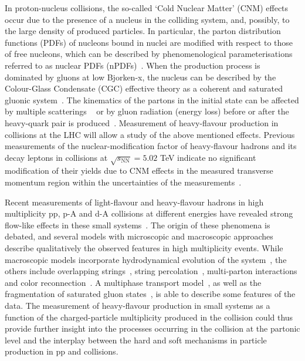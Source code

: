 In proton-nucleus collisions, the so-called ‘Cold Nuclear Matter’ (CNM) effects occur due to the presence of a nucleus in the colliding system, and, possibly, to the large density of produced particles. In particular, the parton distribution functions (PDFs) of nucleons bound in nuclei are modified with respect to those of free nucleons, which can be described by phenomenological parameterisations referred to as nuclear PDFs (nPDFs)~\cite{Eskola:2009uj,deFlorian:2003qf,Hirai:2007sx}. When the production process is dominated by gluons at low Bjorken-x, the nucleus can be described by the Colour-Glass Condensate (CGC) effective theory as a coherent and saturated gluonic system~\cite{Fujii:2013yja,Tribedy:2011aa,Albacete:2012xq,Rezaeian:2012ye}. The kinematics of the partons in the initial state can be affected by multiple scatterings 
~\cite{Lev:1983hh,Kopeliovich:2002yh} or by gluon radiation (energy loss) before or after the heavy-quark pair is produced~\cite{Vitev:2007ve}. Measurement of heavy-flavour production in \pPb collisions at the LHC will allow a study of the above mentioned effects. Previous measurements of the nuclear-modification factor of heavy-flavour hadrons and its decay leptons in \pPb collisions at $\sqrt{s_{\textrm{NN}}}=5.02$ TeV indicate no significant modification of their yields due to CNM effects in the measured  transverse momentum region within the uncertainties of the measurements~\cite{Adam:2015qda,Adam:2016wyz,Abelev:2014hha}. 


Recent measurements of light-flavour and heavy-flavour hadrons in high multiplicity pp, p-A and d-A collisions at different energies have revealed strong flow-like effects in these small systems~\cite{Acharya:2018dxy,Abelev:2012ola,Aaboud:2016yar,Chatrchyan:2013nka,ABELEV:2013wsa,Khachatryan:2014jra,Adare:2013piz,Adamczyk:2015xjc,Adare:2015ctn,Khachatryan:2010gv}. The origin of these phenomena is debated, and several models with microscopic and macroscopic approaches describe qualitatively the observed features in high multiplicity events.  While macroscopic models incorporate hydrodynamical evolution of the system~\cite{Werner:2010ss,Deng:2011at,Werner:2013ipa}, the others include overlapping strings~\cite{Bierlich:2014xba}, string percolation~\cite{Bautista:2015kwa}, multi-parton interactions and color reconnection~\cite{Sjostrand:2014zea,Ortiz:2013yxa}. A multiphase transport model~\cite{Koop:2015wea}, as well as the fragmentation of saturated gluon states~\cite{Schlichting:2016sqo,Schenke:2016lrs}, is able to describe some features of the data. The measurement of heavy-flavour production in small systems as a function of the charged-particle multiplicity produced in the collision could thus provide further insight into the processes occurring in the collision at the partonic level and the interplay between the hard and soft mechanisms in particle production in pp and \pPb collisions. 

